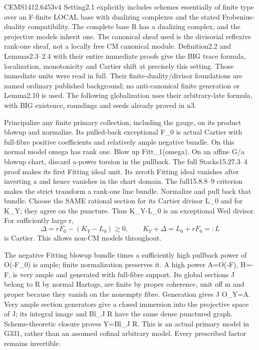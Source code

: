 \documentclass[11pt]{article}
\begin{document}
CEMS1412.6453v4 Setting2.1 explicitly includes schemes essentially of finite type over an F-finite LOCAL base with dualizing complexes and the stated Frobenius-duality compatibility. The complete base R has a dualizing complex, and the projective models inherit one. The canonical sheaf used is the divisorial reflexive rank-one sheaf, not a locally free CM canonical module. Definition2.2 and Lemmas2.3--2.4 with their entire immediate proofs give the BIG trace formula, localization, monotonicity and Cartier shift at precisely this setting. Those immediate units were read in full. Their finite-duality/divisor foundations are named ordinary published background; no anti-canonical finite generation or Lemma2.10 is used. The following globalization uses their arbitrary-late formula, with BIG existence, roundings and seeds already proved in n3.

Principalize any finite primary collection, including the gauge, on its product blowup and normalize. Its pulled-back exceptional F\_0 is actual Cartier with full-fibre positive coefficients and relatively ample negative bundle. On this normal model omega has rank one. Blow up Fitt\_1(omega). On an affine G/a blowup chart, discard a-power torsion in the pullback. The full Stacks15.27.3--4 proof makes its first Fitting ideal unit. Its zeroth Fitting ideal vanishes after inverting a and hence vanishes in the chart domain. The full15.8.8--9 criterion makes the strict transform a rank-one line bundle. Normalize and pull back that bundle. Choose the SAME rational section for its Cartier divisor L\_0 and for K\_Y; they agree on the puncture. Thus K\_Y-L\_0 is an exceptional Weil divisor. For sufficiently large r,
\[
\Delta=rF_0-(K_Y-L_0)\ge0,\qquad K_Y+\Delta=L_0+rF_0=:L
\]
is Cartier. This allows non-CM models throughout.

The negative Fitting blowup bundle times a sufficiently high pullback power of O(-F\_0) is ample; finite normalization preserves it. A high power A=O(-F), H=-F, is very ample and generated with full-fibre support. Its global sections J belong to R by normal Hartogs, are finite by proper coherence, unit off m and proper because they vanish on the nonempty fibre. Generation gives J O\_Y=A. Very ample section generators give a closed immersion into the projective space of J; its integral image and Bl\_J R have the same dense punctured graph. Scheme-theoretic closure proves Y=Bl\_J R. This is an actual primary model in G331, rather than an assumed cofinal arbitrary model. Every prescribed factor remains invertible.
\end{document}
